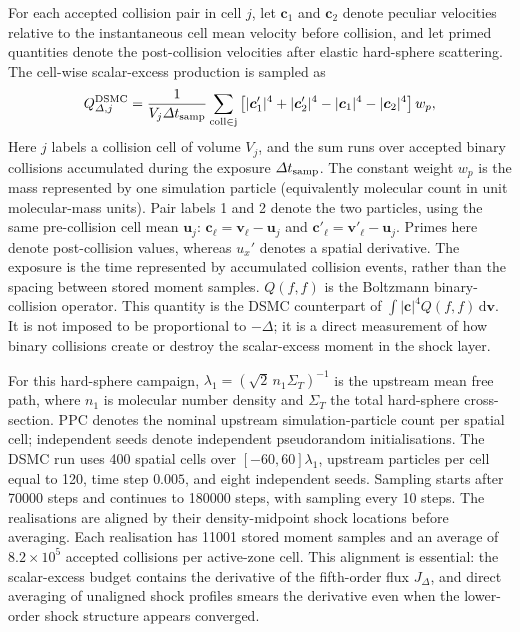 \documentclass[lineno,paper]{JFM-FLM_Au}
\newcommand{\dd}{\mathrm{d}}
\begin{document}
For each accepted collision pair in cell $j$, let $\boldsymbol c_1$ and $\boldsymbol c_2$ denote peculiar velocities relative to the instantaneous cell mean velocity before collision, and let primed quantities denote the post-collision velocities after elastic hard-sphere scattering.  The cell-wise scalar-excess production is sampled as
\begin{equation}
  Q_{\Delta,j}^{\rm DSMC}
  =\frac{1}{V_j\Delta t_{\rm samp}}
  \sum_{\rm coll\in j}
  \left[
  |\boldsymbol c'_1|^4+|\boldsymbol c'_2|^4
  -|\boldsymbol c_1|^4-|\boldsymbol c_2|^4
  \right]w_p,
  \label{eq:dsmc_qdelta}
\end{equation}
Here $j$ labels a collision cell of volume $V_j$, and the sum runs
over accepted binary collisions accumulated during the exposure
$\Delta t_{\rm samp}$. The constant weight $w_p$ is the mass
represented by one simulation particle (equivalently molecular count
in unit molecular-mass units). Pair labels 1 and 2 denote the two
particles, using the same pre-collision cell mean $\boldsymbol u_j$:
$\boldsymbol c_\ell=\boldsymbol v_\ell-\boldsymbol u_j$ and
$\boldsymbol c'_\ell=\boldsymbol v'_\ell-\boldsymbol u_j$.
Primes here denote post-collision values, whereas $u_x'$ denotes a
spatial derivative. The exposure is the time represented by accumulated
collision events, rather than the spacing between stored moment samples.
$Q(f,f)$ is the Boltzmann binary-collision operator.  This quantity is the DSMC counterpart of $\int |\boldsymbol c|^4Q(f,f)\,\dd\boldsymbol v$.  It is not imposed to be proportional to $-\Delta$; it is a direct measurement of how binary collisions create or destroy the scalar-excess moment in the shock layer.

For this hard-sphere campaign,
$\lambda_1=(\sqrt{2}\,n_1\Sigma_T)^{-1}$ is the upstream mean free
path, where $n_1$ is molecular number density and $\Sigma_T$ the total
hard-sphere cross-section. PPC denotes the nominal upstream
simulation-particle count per spatial cell; independent seeds denote
independent pseudorandom initialisations. The DSMC run uses 400 spatial cells over $[-60,60]\lambda_1$, upstream particles per cell equal to 120, time step $0.005$, and eight independent seeds.  Sampling starts after 70000 steps and continues to 180000 steps, with sampling every 10 steps.  The realisations are aligned by their density-midpoint shock locations before averaging.  Each realisation has 11001 stored moment samples and an average of $8.2\times10^5$ accepted collisions per active-zone cell.  This alignment is essential: the scalar-excess budget contains the derivative of the fifth-order flux $J_\Delta$, and direct averaging of unaligned shock profiles smears the derivative even when the lower-order shock structure appears converged.
\end{document}
